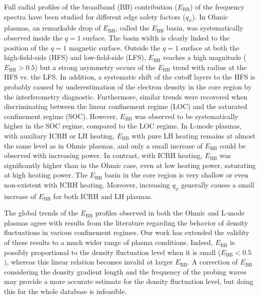 Full radial profiles of the broadband (BB) contribution ($E_\mathrm{BB}$) of the frequency spectra have been studied for different edge safety factors ($q_{\psi}$). In Ohmic plasmas, an remarkable drop of $E_\mathrm{BB}$, called the $E_\mathrm{BB}$ basin, was systematically observed inside the $q = 1$ surface. The basin width is clearly linked to the position of the $q = 1$ magnetic surface. Outside the $q = 1$ surface at both the high-field-side (HFS) and low-field-side (LFS), $E_\mathrm{BB}$ reaches a high magnitude ($E_\mathrm{BB} > 0.5$) but a strong asymmetry occurs of the $E_\mathrm{BB}$ trend with radius
at the HFS vs. the LFS. In addition, a systematic shift of the cutoff layers to the HFS is probably caused by underestimation of the electron density in the core region by the interferometry diagnostic. Furthermore, similar trends were recovered when discriminating between the linear confinement regime (LOC) and the saturated confinement regime (SOC). However, $E_\mathrm{BB}$ was observed to be systematically higher in the SOC regime, compared to the LOC regime. In L-mode plasmas, with auxiliary ICRH or LH heating, $E_\mathrm{BB}$ with pure LH heating remains at almost the same level as in Ohmic plasmas, and only a small increase of $E_\mathrm{BB}$ could be observed with increasing power. In contrast, with ICRH heating, $E_\mathrm{BB}$ was significantly higher than in the Ohmic case, even at low heating power, saturating at high heating power. The $E_\mathrm{BB}$ basin in the core region is very shallow or even non-existent with ICRH heating. Moreover, increasing $q_{\psi}$ generally causes a small increase of $E_\mathrm{BB}$ for both ICRH and LH plasmas.

The global trends of the $E_\mathrm{BB}$ profiles observed in both the Ohmic and L-mode plasmas agree with results from the literature regarding the behavior of density fluctuations in various confinement regimes. Our work has extended the validity of these results to a much wider range of plasma conditions. Indeed, $E_\mathrm{BB}$ is possibly proportional to the density fluctuation level when it is small ($E_\mathrm{BB} < 0.5$), whereas this linear relation becomes invalid at larger $E_\mathrm{BB}$. A correction of $E_\mathrm{BB}$ considering the density gradient length and the frequency of the probing waves may provide a more accurate estimate for the density fluctuation level, but doing this for the whole database is infeasible.


